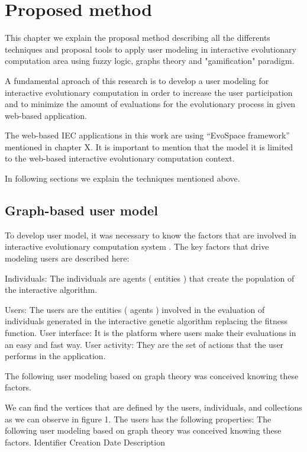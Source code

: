 \chapter{Proposed method}

This chapter we explain the proposal method describing all the differents
techniques and proposal tools to apply user modeling in interactive evolutionary
computation area using fuzzy logic, graphs theory and "gamification" paradigm.

A fundamental aproach of this research is to develop a user modeling for
interactive evolutionary computation in order to increase the user participation
and to minimize the amount of evaluations for the evolutionary process in given 
web-based application.

The web-based IEC applications in this work are using
“EvoSpace framework” mentioned in chapter X. It is important to mention that the
model it is limited to the web-based interactive evolutionary computation context.

In following sections we explain the techniques mentioned above.


\section{Graph-based user model} 

To develop user model, it was necessary to know the factors that are involved in
interactive evolutionary computation system . The key factors
that drive modeling users are described here:

Individuals: The individuals are agents ( entities ) that create the population
of the interactive algorithm.

Users: The users are the entities ( agents )
involved in the evaluation of individuals generated in the interactive genetic
algorithm replacing the fitness function. 
User interface: It is the platform where users make their evaluations in an 
easy and fast way. 
User activity: They are the set of actions that the user performs in the application.

The following user modeling based on graph theory was conceived knowing these factors.

We can find the vertices that are defined by the users, individuals, and
collections as we can observe in figure 1. The users has the following
properties: The following user modeling based on graph theory was conceived
knowing these factors.  Identifier Creation Date Description

